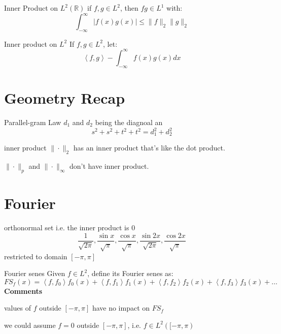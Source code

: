 \documentclass[a4paper]{article}
\newcommand{\R}{\mathbb{R}}
\begin{document}
\begin{Theorem}{Inner Product on $L^2(\R)$}{}
	if $f,g \in L^2$, then  $fg \in L^1$ with: \[
		\int_{-\infty}^{\infty} \left| f(x)g(x) \right| \le  \| f\|_2 \|g\|_2
	\] 
\end{Theorem}

\begin{Definition}{Inner product on $L^2$}{}
	If $f,g \in L^2$, let:  \[
		\left< f,g \right> - \int_{-\infty}^{\infty} f(x)g(x) dx
	\] 
\end{Definition}

\section{Geometry Recap}

\begin{Theorem}{Parallel-gram Law}{}
	$d_1$ and $d_2$ being the diagnoal an \[
	s^2 + s^2 + t^2 +t^2 = d_1^2 + d_2^2
	\] 	
\end{Theorem}

\begin{Corollary}{inner product}{}
	$\|\cdot \|_2$ has an inner product that's like the dot product. 

	$\| \cdot \|_p$ and  $\| \cdot \|_{\infty}$ don't have inner product.
\end{Corollary}

\section{Fourier}

\begin{Example}{orthonormal set}{}
	i.e. the inner product is 0 \[
		\frac{1}{\sqrt{2\pi} }, \frac{\sin x}{\sqrt{\pi} }, \frac{\cos x}{\sqrt{\pi}}, \frac{\sin 2x}{\sqrt{2\pi}}, \frac{\cos 2x}{\sqrt{\pi}}
	\] restricted to domain $\left[ -\pi,\pi \right] $
\end{Example}

\begin{Definition}{Fourier senes}{}
	Given  $f \in L^2$, define its Fourier senes as: \[
		FS_f(x) = \left<f, f_0 \right> f_0(x) + \left<f, f_1 \right> f_1(x) + \left<f, f_2 \right> f_2(x) + \left<f,f_3 \right> f_3(x) + \ldots
	\]
\tcblower
\textbf{Comments}

values of $f$ outside  $\left[ -\pi,\pi \right] $ have no impact on $FS_f$

we could assume  $f = 0$ outside  $\left[ -\pi,\pi \right] $, i.e. $f \in L^2\left( [-\pi,\pi \right) $
\end{Definition}
\end{document}
